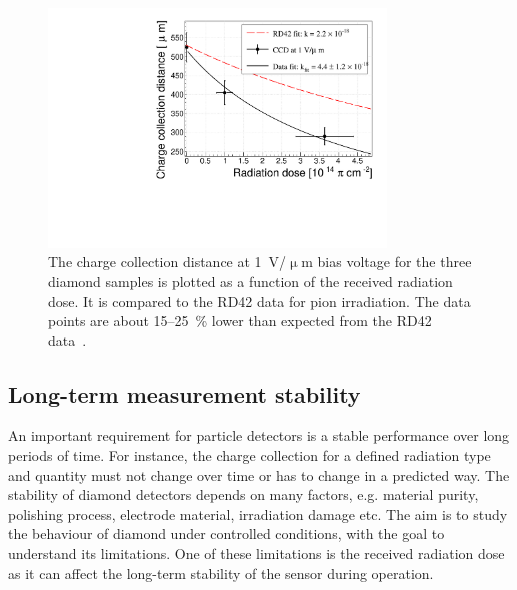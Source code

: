 \begin{figure}[!t]
\centering
\includegraphics[width=0.80\textwidth]{03_measurement_results/scripts/plots/radfactor1}
\caption{The charge collection distance at 1~V/$\upmu$m bias voltage for the three diamond samples is plotted as a function of the received radiation dose. It is compared to the RD42 data for pion irradiation. The data points are about 15--25~\% lower than expected from the RD42 data~\cite{RD42IRRAD:00000}.}
 \label{fig:radfactor}
\end{figure}



\subsection{Long-term measurement stability}
An important requirement for particle detectors is a stable performance over long periods of time. For instance, the charge collection for a defined radiation type and quantity must not change over time or has to change in a predicted way. The stability of diamond detectors depends on many factors, e.g. material purity, polishing process, electrode material, irradiation damage etc. The aim is to study the behaviour of diamond under controlled conditions, with the goal to understand its limitations. One of these limitations is the received radiation dose as it can affect the long-term stability of the sensor during operation. 

